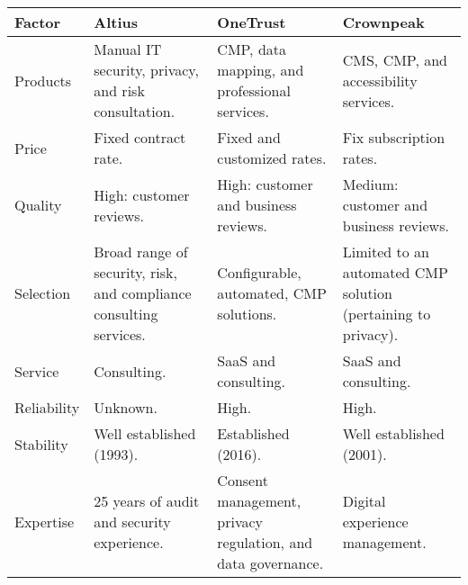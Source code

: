 
\begin{sidewaystable}
  \centering
  \setlength\tabcolsep{5pt}
  \def\arraystretch{1.2}%

  \begin{tabularx}{\textwidth}{p{2.5cm} | p{6.5cm} | p{6.5cm} | p{6.5cm}}

    \hline

    Factor & Altius & OneTrust & Crownpeak  \\

    \hline
  
    Products & Manual IT security, privacy, and risk consultation.  & CMP, data mapping, and professional services. & CMS, CMP, and accessibility services. \\

    \hline

    Price & Fixed contract rate. & Fixed and customized rates. & Fix subscription rates. \\

    \hline

    Quality & High: customer reviews. & High: customer and business reviews. & Medium: customer and business reviews. \\

    \hline

    Selection & Broad range of security, risk, and compliance consulting services. & Configurable, automated, CMP solutions. & Limited to an automated CMP solution (pertaining to privacy). \\

    \hline

    Service & Consulting. & SaaS and consulting. & SaaS and consulting. \\

    \hline

    Reliability & Unknown. & High. & High. \\

    \hline

    Stability & Well established (1993). & Established (2016). & Well established (2001). \\

    \hline

    Expertise & 25 years of audit and security experience. & Consent management, privacy regulation, and data governance. & Digital experience management. \\

    \hline


\end{tabularx}
\end{sidewaystable}
